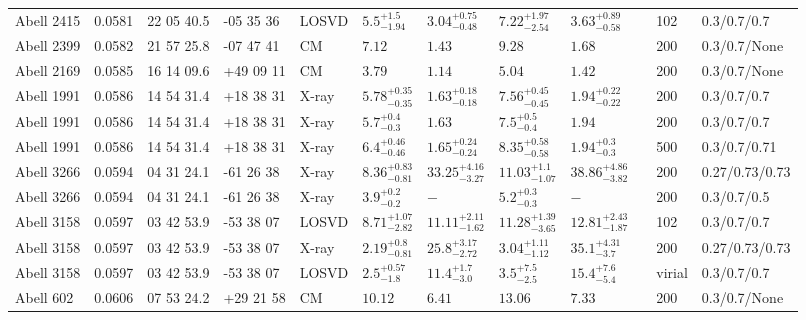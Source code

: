 \begin{landscape}
\begin{center}
{\begin{longtable}{llllllllllll}
Abell 2415 & 0.0581 & 22 05 40.5 & -05 35 36 & LOSVD & ${5.5}^{+1.5}_{-1.94}$ & ${3.04}^{+0.75}_{-0.48}$ & ${7.22}^{+1.97}_{-2.54}$ & ${3.63}^{+0.89}_{-0.58}$ & \citet{WO10.1} & 102 & 0.3/0.7/0.7 \\
Abell 2399 & 0.0582 & 21 57 25.8 & -07 47 41 & CM & ${7.12}^{}_{}$ & ${1.43}^{}_{}$ & ${9.28}^{}_{}$ & ${1.68}^{}_{}$ & \citet{RI06.1} & 200 & 0.3/0.7/None \\
Abell 2169 & 0.0585 & 16 14 09.6 & +49 09 11 & CM & ${3.79}^{}_{}$ & ${1.14}^{}_{}$ & ${5.04}^{}_{}$ & ${1.42}^{}_{}$ & \citet{RI06.1} & 200 & 0.3/0.7/None \\
Abell 1991 & 0.0586 & 14 54 31.4 & +18 38 31 & X-ray & ${5.78}^{+0.35}_{-0.35}$ & ${1.63}^{+0.18}_{-0.18}$ & ${7.56}^{+0.45}_{-0.45}$ & ${1.94}^{+0.22}_{-0.22}$ & \citet{PO05.1} & 200 & 0.3/0.7/0.7 \\
Abell 1991 & 0.0586 & 14 54 31.4 & +18 38 31 & X-ray & ${5.7}^{+0.4}_{-0.3}$ & ${1.63}^{}_{}$ & ${7.5}^{+0.5}_{-0.4}$ & ${1.94}^{}_{}$ & \citet{PR05.1} & 200 & 0.3/0.7/0.7 \\
Abell 1991 & 0.0586 & 14 54 31.4 & +18 38 31 & X-ray & ${6.4}^{+0.46}_{-0.46}$ & ${1.65}^{+0.24}_{-0.24}$ & ${8.35}^{+0.58}_{-0.58}$ & ${1.94}^{+0.3}_{-0.3}$ & \citet{VI06.1} & 500 & 0.3/0.7/0.71 \\
Abell 3266 & 0.0594 & 04 31 24.1 & -61 26 38 & X-ray & ${8.36}^{+0.83}_{-0.81}$ & ${33.25}^{+4.16}_{-3.27}$ & ${11.03}^{+1.1}_{-1.07}$ & ${38.86}^{+4.86}_{-3.82}$ & \citet{BA14.1} & 200 & 0.27/0.73/0.73 \\
Abell 3266 & 0.0594 & 04 31 24.1 & -61 26 38 & X-ray & ${3.9}^{+0.2}_{-0.2}$ & ${-}^{}_{}$ & ${5.2}^{+0.3}_{-0.3}$ & ${-}^{}_{}$ & \citet{XU01.1} & 200 & 0.3/0.7/0.5 \\
Abell 3158 & 0.0597 & 03 42 53.9 & -53 38 07 & LOSVD & ${8.71}^{+1.07}_{-2.82}$ & ${11.11}^{+2.11}_{-1.62}$ & ${11.28}^{+1.39}_{-3.65}$ & ${12.81}^{+2.43}_{-1.87}$ & \citet{WO10.1} & 102 & 0.3/0.7/0.7 \\
Abell 3158 & 0.0597 & 03 42 53.9 & -53 38 07 & X-ray & ${2.19}^{+0.8}_{-0.81}$ & ${25.8}^{+3.17}_{-2.72}$ & ${3.04}^{+1.11}_{-1.12}$ & ${35.1}^{+4.31}_{-3.7}$ & \citet{BA14.1} & 200 & 0.27/0.73/0.73 \\
Abell 3158 & 0.0597 & 03 42 53.9 & -53 38 07 & LOSVD & ${2.5}^{+0.57}_{-1.8}$ & ${11.4}^{+1.7}_{-3.0}$ & ${3.5}^{+7.5}_{-2.5}$ & ${15.4}^{+7.6}_{-5.4}$ & \citet{LO06.1} & virial & 0.3/0.7/0.7 \\
Abell 602 & 0.0606 & 07 53 24.2 & +29 21 58 & CM & ${10.12}^{}_{}$ & ${6.41}^{}_{}$ & ${13.06}^{}_{}$ & ${7.33}^{}_{}$ & \citet{RI06.1} & 200 & 0.3/0.7/None \\

\end{longtable}}
\end{center}
\end{landscape}
